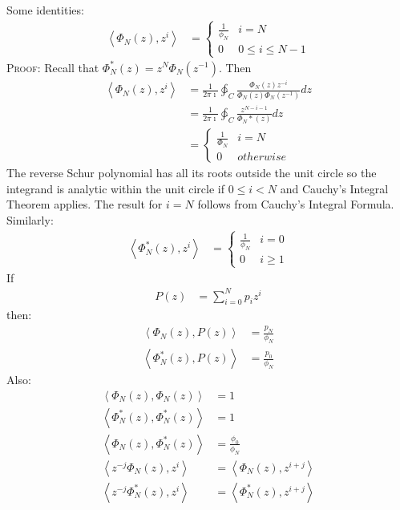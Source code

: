 \documentclass[a4paper,twoside,10pt,english]{report}
\begin{document}
Some identities:
\begin{align*}
\left\langle \Phi_{N}\left(z\right),z^{i}\right\rangle  & = \begin{cases}
\frac{1}{\phi_{N}} & i=N\\
0 & 0\leq i\leq N-1
\end{cases}
\end{align*}
\textsc{Proof:} Recall that 
$\Phi_{N}^{*}\left(z\right)=z^{N}\Phi_{N}\left(z^{-1}\right)$. Then
\begin{align*}
\left\langle \Phi_{N}\left(z\right),z^{i}\right\rangle  & = \frac{1}{2\pi \imath}\ointctrclockwise_{C}\frac{\Phi_{N}\left(z\right)z^{-i}}{\Phi_{N}\left(z\right)\Phi_{N}\left(z^{-1}\right)}dz\\
 & = \frac{1}{2\pi \imath}\ointctrclockwise_{C}\frac{z^{N-i-1}}{\Phi_{N}{*}\left(z\right)}dz\\
 & = \begin{cases}
\frac{1}{\Phi_{N}} & i=N\\
0 & otherwise
\end{cases}
\end{align*}
The reverse Schur polynomial has all its roots outside the unit circle
so the integrand is analytic within the unit circle if $0\leq i<N$
and Cauchy's Integral Theorem applies. The result for $i=N$ follows
from Cauchy's Integral Formula.\bigskip{}
Similarly:
\begin{align*}
\left\langle \Phi_{N}^{*}\left(z\right),z^{i}\right\rangle  & = \begin{cases}
\frac{1}{\phi_{N}} & i=0\\
0 & i\geq1
\end{cases}
\end{align*}
If 
\begin{align*}
P\left(z\right) & = \sum_{i=0}^{N}p_{i}z^{i}
\end{align*}
then:
\begin{align*}
\left\langle \Phi_{N}\left(z\right),P\left(z\right)\right\rangle  & = \frac{p_{N}}{\phi_{N}}\\
\left\langle \Phi_{N}^{*}\left(z\right),P\left(z\right)\right\rangle  & = \frac{p_{0}}{\phi_{N}}
\end{align*}
Also:
\begin{align*}
\left\langle \Phi_{N}\left(z\right),\Phi_{N}\left(z\right)\right\rangle  & = 1\\
\left\langle \Phi_{N}^{*}\left(z\right),\Phi_{N}^{*}\left(z\right)\right\rangle  & = 1\\
\left\langle \Phi_{N}\left(z\right),\Phi_{N}^{*}\left(z\right)\right\rangle  & = \frac{\phi_{0}}{\phi_{N}}\\
\left\langle z^{-j}\Phi_{N}\left(z\right),z^{i}\right\rangle  & = \left\langle \Phi_{N}\left(z\right),z^{i+j}\right\rangle \\
\left\langle z^{-j}\Phi_{N}^{*}\left(z\right),z^{i}\right\rangle  & = \left\langle \Phi_{N}^{*}\left(z\right),z^{i+j}\right\rangle 
\end{align*}
\end{document}
